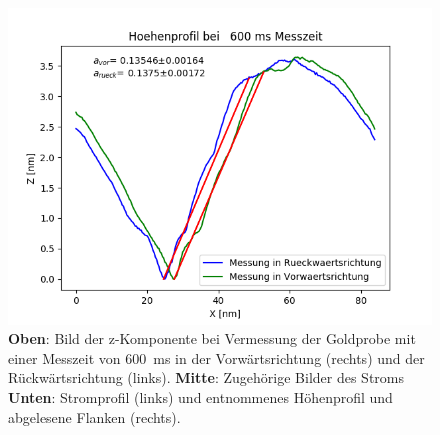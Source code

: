 \documentclass[12pt,a4paper]{article}
\begin{document}
\begin{figure}[H]
\includegraphics[scale=0.5]{Bilder/Anhang/Zeit/Profil_Zeit_600.png}
\caption{\textbf{Oben}: Bild der z-Komponente bei Vermessung der Goldprobe mit einer Messzeit von \SI{600}{ms} in der Vorwärtsrichtung (rechts) und der Rückwärtsrichtung (links). \textbf{Mitte}: Zugehörige Bilder des Stroms \textbf{Unten}: Stromprofil (links) und entnommenes Höhenprofil und abgelesene Flanken (rechts).}
\end{figure}
\end{document}
